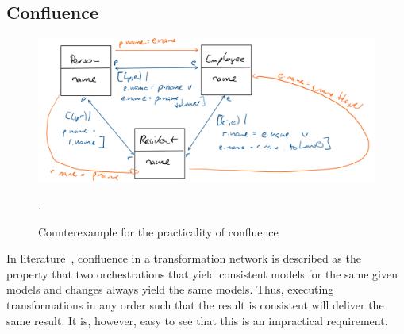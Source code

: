 \subsection{Confluence}

\begin{figure}
    \centering
    \includegraphics[width=\textwidth]{figures/correctness/orchestration/confluence.png}
    \caption[Confluence of transformations]{Counterexample for the practicality of confluence}.
    \label{fig:orchestration:confluence}
\end{figure}

In literature~\cite{stevens2020BidirectionalTransformationLarge-SoSym}, confluence in a transformation network is described as the property that two orchestrations that yield consistent models for the same given models and changes always yield the same models.
Thus, executing transformations in any order such that the result is consistent will deliver the same result.
It is, however, easy to see that this is an impractical requirement.

